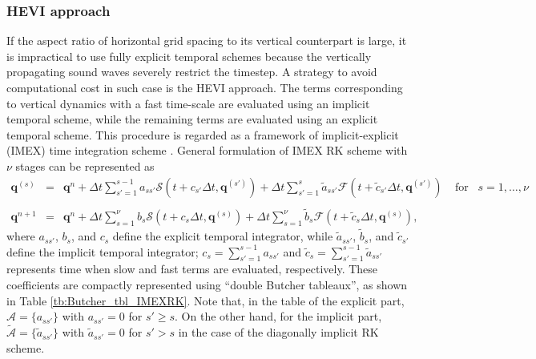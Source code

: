 \subsubsection{HEVI approach}
\label{sssec:temporal_discretization_hevi}
If the aspect ratio of horizontal grid spacing to its vertical counterpart is large, 
it is impractical to use fully explicit temporal schemes 
because 
the vertically propagating sound waves severely restrict the timestep. 
A strategy to avoid computational cost in such case is the HEVI approach. 
The terms corresponding to vertical dynamics with a fast time-scale 
are evaluated using an implicit temporal scheme, 
while 
the remaining terms are evaluated using an explicit temporal scheme. 
This procedure is regarded as a framework of 
implicit-explicit (IMEX) time integration scheme
\citep{Bao2015HEVI,Gardner2018IMEX}. 
General formulation of IMEX RK scheme \citep[e.g.,][]{ASCHER1997IMEX} with $\nu$ stages can be represented as 
\begin{eqnarray}
 \bm{q}^{(s)} &=& \bm{q}^n 
                 + \Delta t \sum_{s'=1}^{s-1} a_{ss'} \mathcal{S}(t+c_{s'}\Delta t, \bm{q}^{(s')})
                 + \Delta t \sum_{s'=1}^{s} \tilde{a}_{ss'} \mathcal{F}(t+\tilde{c}_{s'}\Delta t, \bm{q}^{(s')}) 
 \;\;\;\; \textrm{for}\;\;\; s=1, \dots, \nu  \nonumber \\
 \nonumber \\
 \bm{q}^{n+1} &=& \bm{q}^n 
                + \Delta t \sum_{s=1}^{\nu} b_{s} \mathcal{S}(t+c_{s}\Delta t, \bm{q}^{(s)})
                + \Delta t \sum_{s=1}^{\nu} \tilde{b}_{s} \mathcal{F}(t+\tilde{c}_{s}\Delta t, \bm{q}^{(s)}), 
\end{eqnarray}
where 
$a_{ss'}$, $b_s$, and $c_{s}$ define the explicit temporal integrator, 
while $\tilde{a}_{ss'}$, $\tilde{b}_s$, and $\tilde{c}_{s'}$ define the implicit temporal integrator; 
$c_s=\sum_{s'=1}^{s-1} a_{ss'}$ and $\tilde{c}_s = \sum_{s'=1}^{s-1} \tilde{a}_{ss'}$ 
represents time when slow and fast terms are evaluated, respectively. 
These coefficients are compactly represented using ``double Butcher tableaux'', 
as shown in Table \ref{tb:Butcher_tbl_IMEXRK}.  
Note that, in the table of the explicit part, 
$\mathscr{A}=\{a_{ss'}\}$ with $a_{ss'}=0$ for $s' \ge s$. 
On the other hand, 
for the implicit part,  
$\tilde{\mathscr{A}}=\{\tilde{a}_{ss'}\}$ with $\tilde{a}_{ss'}=0$ for $s' > s$ 
in the case of the diagonally implicit RK scheme. 


